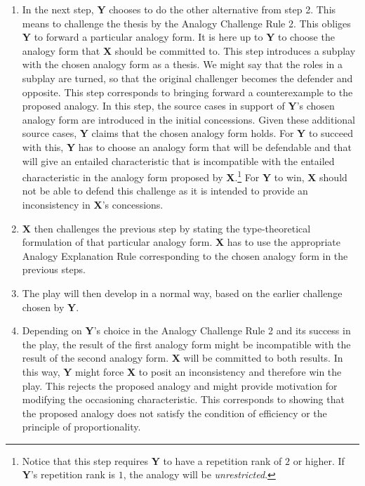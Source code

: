 \begin{enumerate}
			\item In the next step, \textbf{Y} chooses to do the other alternative from step 2. This means to challenge the thesis by the Analogy Challenge Rule 2. This obliges \textbf{Y} to forward a particular analogy form. It is here up to \textbf{Y} to choose the analogy form that \textbf{X} should be committed to. This step introduces a subplay with the chosen analogy form as a thesis. We might say that the roles in a subplay are turned, so that the original challenger becomes the defender and opposite. This step corresponds to bringing forward a counterexample to the proposed analogy. In this step, the source cases in support of \textbf{Y}'s chosen analogy form are introduced in the initial concessions. Given these additional source cases, \textbf{Y} claims that the chosen analogy form holds. For \textbf{Y} to succeed with this, \textbf{Y} has to choose an analogy form that will be defendable and that will give an entailed characteristic that is incompatible with the entailed characteristic in the analogy form proposed by \textbf{X}.\footnote{Notice that this step requires \textbf{Y} to have a repetition rank of $2$ or higher. If \textbf{Y}'s repetition rank is $1$, the analogy will be \emph{unrestricted}.} For \textbf{Y} to win, \textbf{X} should not be able to defend this challenge as it is intended to provide an inconsistency in \textbf{X}'s concessions.
			\item \textbf{X} then challenges the previous step by stating the type-theoretical formulation of that particular analogy form. \textbf{X} has to use the appropriate Analogy Explanation Rule corresponding to the chosen analogy form in the previous steps.
			\item The play will then develop in a normal way, based on the earlier challenge chosen by \textbf{Y}.
			\item Depending on \textbf{Y}'s choice in the Analogy Challenge Rule 2 and its success in the play, the result of the first analogy form might be incompatible with the result of the second analogy form. \textbf{X} will be committed to both results. In this way, \textbf{Y} might force \textbf{X} to posit an inconsistency and therefore win the play. This rejects the proposed analogy and might provide motivation for modifying the occasioning characteristic. This corresponds to showing that the proposed analogy does not satisfy the condition of efficiency or the principle of proportionality. 
		\end{enumerate}	
		
